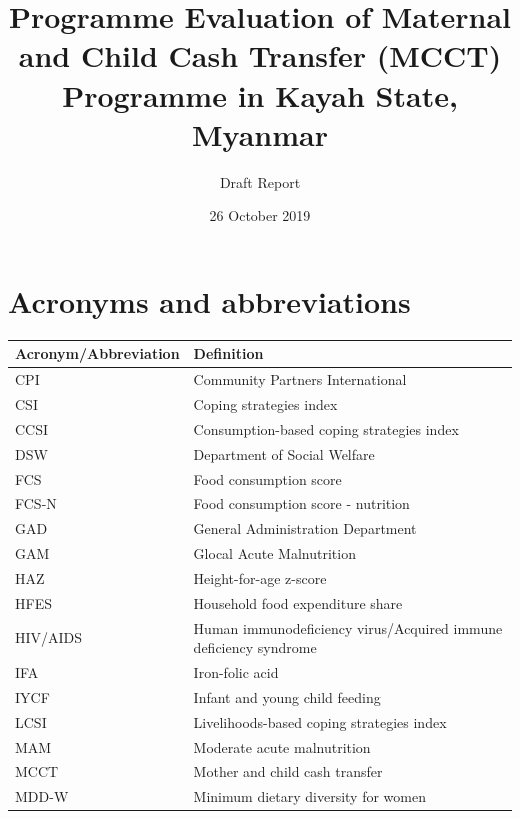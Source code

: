 \documentclass[12pt,a4paper]{article}
\title{\vspace{8cm} \LARGE{Programme Evaluation of Maternal and Child Cash Transfer (MCCT) Programme in Kayah State, Myanmar}}
\subtitle{Draft Report}
\author{}
\date{26 October 2019}
\begin{document}
\maketitle

\newpage

{
\hypersetup{linkcolor=black}
\setcounter{tocdepth}{4}
\tableofcontents
}
\listoftables
\listoffigures
\newpage

\hypertarget{acronyms-and-abbreviations}{%
\section*{Acronyms and abbreviations}\label{acronyms-and-abbreviations}}

\begin{table}[H]
\centering
\begin{tabular}{l>{\raggedright\arraybackslash}p{8cm}}
\toprule
\textbf{Acronym/Abbreviation} & \textbf{Definition}\\
\midrule
\rowcolor{gray!6}  CPI & Community Partners International\\
CSI & Coping strategies index\\
\rowcolor{gray!6}  CCSI & Consumption-based coping strategies index\\
DSW & Department of Social Welfare\\
\rowcolor{gray!6}  FCS & Food consumption score\\
\addlinespace
FCS-N & Food consumption score - nutrition\\
\rowcolor{gray!6}  GAD & General Administration Department\\
GAM & Glocal Acute Malnutrition\\
\rowcolor{gray!6}  HAZ & Height-for-age z-score\\
HFES & Household food expenditure share\\
\addlinespace
\rowcolor{gray!6}  HIV/AIDS & Human immunodeficiency virus/Acquired immune deficiency syndrome\\
IFA & Iron-folic acid\\
\rowcolor{gray!6}  IYCF & Infant and young child feeding\\
LCSI & Livelihoods-based coping strategies index\\
\rowcolor{gray!6}  MAM & Moderate acute malnutrition\\
\addlinespace
MCCT & Mother and child cash transfer\\
\rowcolor{gray!6}  MDD-W & Minimum dietary diversity for women\\

\end{tabular}
\end{table}
\end{document}
